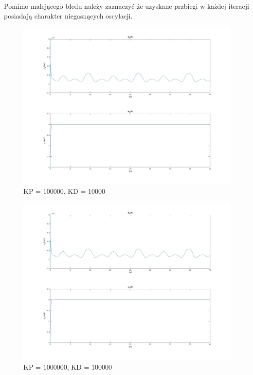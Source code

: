 \documentclass[12pt,a4paper]{article}
\begin{document}
    Pomimo malejącego błedu należy zaznaczyć że uzyskane przbiegi w każdej iteracji posiadają charakter niegasnących oscylacji. 

  \begin{figure}[H]
    \centering
    \includegraphics[height=0.38\textheight]{figures/qui100000.jpg}
    \caption{KP = 100000, KD = 10000}
    \label{fig:100000}
  \end{figure}

  \begin{figure}[H]
    \centering
    \includegraphics[height=0.38\textheight]{figures/qui1000000.jpg}
    \caption{KP = 1000000, KD = 100000}
    \label{fig:1000000}
  \end{figure}
\end{document}
